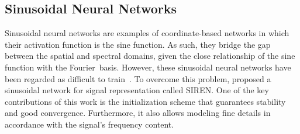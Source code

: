 


\subsection{Sinusoidal Neural Networks}

Sinusoidal neural networks are examples of coordinate-based networks in which their activation function is the sine function. As such, they bridge the gap between the spatial and spectral domains, given the close relationship of the sine function with the Fourier~basis. However, these sinusoidal neural networks have been regarded as difficult to train~\cite{taming2017}. To overcome this problem, \citet{sitzmann2019siren} proposed a sinusoidal network for signal representation called SIREN. One of the key contributions of this work is the initialization scheme that guarantees stability and good convergence. Furthermore, it also allows modeling fine details in accordance with the signal’s frequency content.













